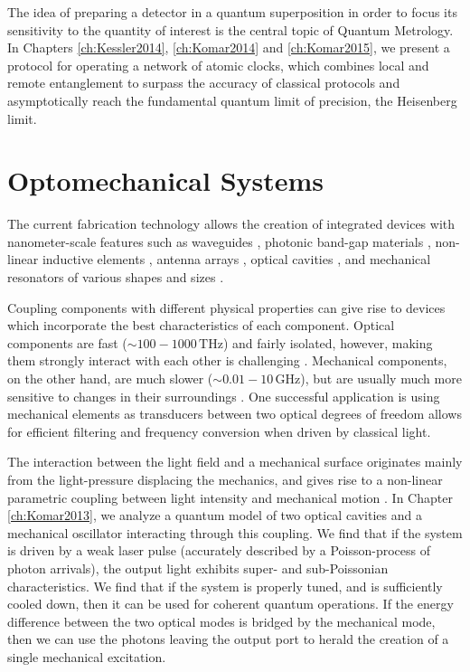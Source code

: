 The idea of preparing a detector in a quantum
superposition in order to focus its sensitivity to the quantity of interest is
the central topic of Quantum Metrology. In Chapters \ref{ch:Kessler2014},
\ref{ch:Komar2014} and \ref{ch:Komar2015}, we present a
protocol for operating a network of atomic clocks, which combines local and
remote entanglement to surpass the accuracy of classical protocols and
asymptotically reach the fundamental quantum limit of precision, the Heisenberg limit. 


 
 
 
 
 
 
\section{Optomechanical Systems}
The current fabrication technology allows the creation of integrated devices
with nanometer-scale features such as waveguides \cite{Mekis1996}, photonic
band-gap materials \cite{Foresi1997}, non-linear inductive elements
\cite{Makhlin1999}, antenna arrays \cite{Yu2014}, optical cavities
\cite{Painter2001}, and mechanical resonators of various shapes and sizes
\cite{Aspelmeyer2014}.

Coupling components with different physical properties can give rise to devices
which incorporate the best characteristics of each component.
Optical components are fast ($\sim 100-1000\,\mathrm{THz}$) and fairly isolated,
however, making them strongly interact with each other is challenging
\cite{Chang2007}.
Mechanical components, on the other hand, are much slower ($\sim
0.01-10\,\mathrm{GHz}$), but are usually much more sensitive to changes in their
surroundings \cite{Aspelmeyer2014}. One successful application is using
mechanical elements as transducers between two optical degrees of freedom allows
for efficient filtering and frequency conversion \cite{Eichenfield2009} when
driven by classical light.

The interaction between the light field and a mechanical surface originates
mainly from the light-pressure displacing the mechanics, and gives rise to a
non-linear parametric coupling between light intensity and mechanical motion
\cite{Meystre2013}. In Chapter \ref{ch:Komar2013}, we analyze a quantum model of
two optical cavities and a mechanical oscillator interacting through this
coupling. We find that if the system is driven by a weak laser pulse (accurately
described by a Poisson-process of photon arrivals), the output light exhibits
super- and sub-Poissonian characteristics. We find that if the system is
properly tuned, and is sufficiently cooled down, then it can be used for
coherent quantum operations.
If the energy difference between the two optical modes is bridged by the
mechanical mode, then we can use the photons leaving the output port to herald
the creation of a single mechanical excitation.

